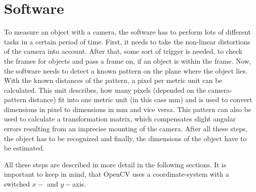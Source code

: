\section{Software}
To measure an object with a camera, the software has to perform lots of different tasks in a certain period of time.
First, it needs to take the non-linear distortions of the camera into account.
After that, some sort of trigger is needed, to check the frames for objects and pass a frame on, if an object is within the frame.
Now, the software needs to detect a known pattern on the plane where the object lies.
With the known distances of the pattern, a pixel per metric unit can be calculated.
This unit describes, how many pixels (depended on the camera-pattern distance) fit into one metric unit (in this case mm) and is used to convert dimensions in pixel to dimensions in mm and vice versa.
This pattern can also be used to calculate a transformation matrix, which compensates slight angular errors resulting from an imprecise mounting of the camera.
After all these steps, the object has to be recognized and
finally, the dimensions of the object have to be estimated.

All these steps are described in more detail in the following sections.
It is important to keep in mind, that OpenCV uses a coordinate-system with a switched $x-$ and $y-$axis. 


\lstset{style=mystyle}


